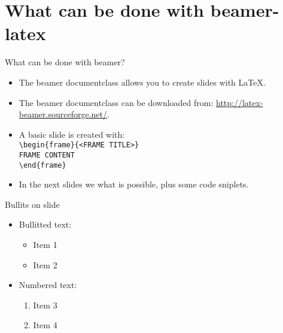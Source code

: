 \documentclass[t,11pt]{beamer}
\begin{document}
\section{What can be done with beamer-latex}

\begin{frame}[fragile]{What can be done with beamer?}
\begin{itemize}
\item	The beamer documentclass allows you to create slides
		with \LaTeX.
\item	The beamer documentclass can be downloaded from:
		\url{http://latex-beamer.sourceforge.net/}.
\item	A basic slide is created with:\\
\vspace{0.1\baselineskip}
\verb|\begin{frame}{<FRAME TITLE>}|\\
\verb|FRAME CONTENT|\\
\verb|\end{frame}|\\
\vspace{0.5\baselineskip}
\item	In the next slides we what is possible, plus some
		code sniplets.
\end{itemize}
\end{frame}


\begin{frame}{Bullits on slide}
\begin{itemize}
\item \alert{Bullitted text:}
  \begin{itemize}
  \item Item 1
  \item Item 2
  \end{itemize}
\vspace{.5\baselineskip}

\item \alert{Numbered text:}
  \begin{enumerate}
  \item Item 3
  \item Item 4
  \end{enumerate}
\end{itemize}
\end{frame}
\end{document}

